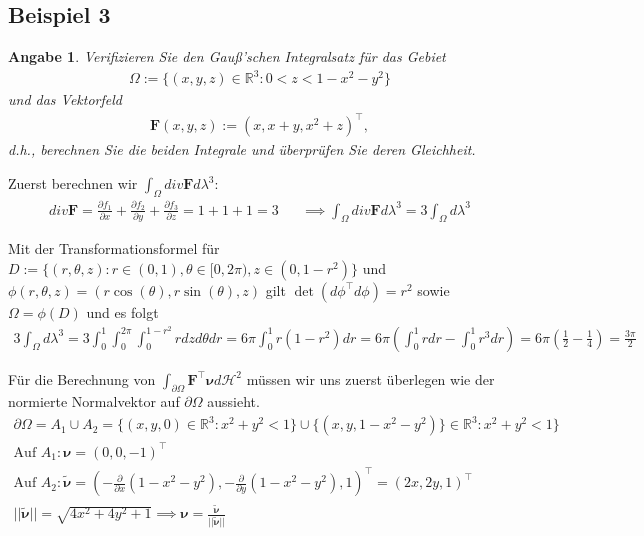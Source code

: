 \documentclass[]{article}
\newtheorem*{angabe*}{Angabe}
\begin{document}
\subsection*{Beispiel 3}
\begin{angabe*}
	Verifizieren Sie den Gauß'schen Integralsatz für das Gebiet
	\begin{align*}
		\Omega := \{(x,y,z) \in \mathbb{R}^3: 0<z<1-x^2-y^2\}
	\end{align*}
	und das Vektorfeld
	\begin{align*}
		\bm{F}(x,y,z) := (x, x+y, x^2+z)^\top,
	\end{align*}
	d.h., berechnen Sie die beiden Integrale und überprüfen Sie deren Gleichheit.
\end{angabe*}

Zuerst berechnen wir $\int_\Omega div\bm{F} d\lambda^3$:
\begin{align*}
	div\bm{F} = \frac{\partial f_1}{\partial x} + \frac{\partial f_2}{\partial y} + \frac{\partial f_3}{\partial z} = 1 + 1 + 1 = 3 && \implies	\int_\Omega div\bm{F} d\lambda^3 = 3 \int_\Omega d\lambda^3
\end{align*}

Mit der Transformationsformel für $D:=\{(r,\theta, z): r \in (0,1), \theta \in [0,2\pi), z \in (0,1-r^2)\}$ und $\phi(r,\theta, z) = (r\cos(\theta), r\sin(\theta), z)$ gilt $\det(d\phi^\top d\phi) = r^2$ sowie $\Omega=\phi(D)$ und es folgt
\begin{align*}
	3 \int_\Omega d\lambda^3 = 3 \int_{0}^{1} \int_{0}^{2\pi} \int_{0}^{1-r^2} r dz d\theta dr = 6\pi \int_{0}^{1} r(1-r^2) dr = 6\pi \left(\int_{0}^{1} r dr - \int_{0}^{1} r^3 dr\right) = 6\pi (\frac{1}{2}-\frac{1}{4}) = \frac{3\pi}{2}
\end{align*}

Für die Berechnung von $\int_{\partial\Omega} \bm{F}^\top \bm{\nu} d\mathcal{H}^2$ müssen wir uns zuerst überlegen wie der normierte Normalvektor auf $\partial\Omega$ aussieht.
\begin{align*}
	\partial\Omega = A_1 \cup A_2 = \{(x,y,0)\in\mathbb{R}^3: x^2+y^2 < 1\} \cup \{(x,y,1-x^2-y^2)\}\in\mathbb{R}^3: x^2+y^2 < 1\}\\
	\text{Auf } A_1: \bm{\nu} = (0,0,-1)^\top\\
	\text{Auf } A_2: \tilde{\bm{\nu}} = \left(-\frac{\partial}{\partial x} (1-x^2-y^2),-\frac{\partial}{\partial y} (1-x^2-y^2), 1\right)^\top = (2x, 2y, 1)^\top\\
	||\tilde{\bm{\nu}}|| = \sqrt{4x^2+4y^2+1} \implies \bm{\nu} = \frac{\tilde{\bm{\nu}}}{||\tilde{\bm{\nu}}||}
\end{align*}
\end{document}
